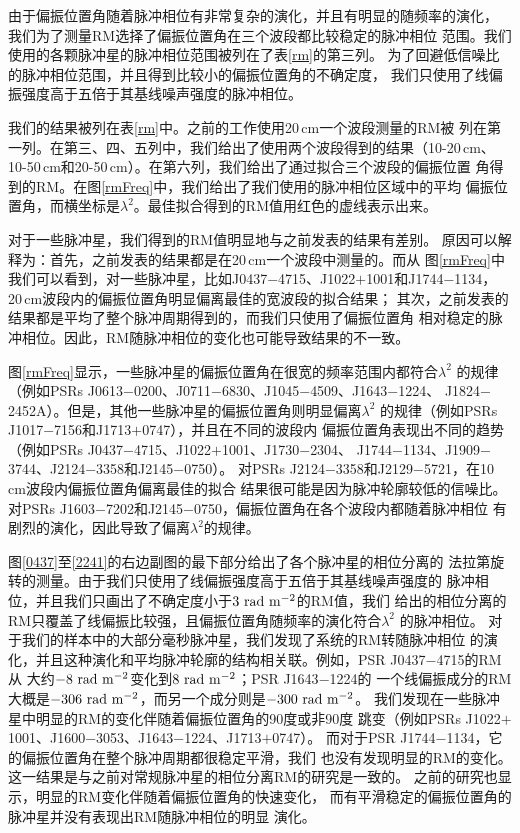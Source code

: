 由于偏振位置角随着脉冲相位有非常复杂的演化，并且有明显的随频率的演化，
我们为了测量RM选择了偏振位置角在三个波段都比较稳定的脉冲相位
范围。我们使用的各颗脉冲星的脉冲相位范围被列在了表\ref{rm}的第三列。
为了回避低信噪比的脉冲相位范围，并且得到比较小的偏振位置角的不确定度，
我们只使用了线偏振强度高于五倍于其基线噪声强度的脉冲相位。

我们的结果被列在表\ref{rm}中。之前的工作使用20\,cm一个波段测量的RM被
列在第一列。在第三、四、五列中，我们给出了使用两个波段得到的结果（10-20\,cm、
10-50\,cm和20-50\,cm）。在第六列，我们给出了通过拟合三个波段的偏振位置
角得到的RM。在图\ref{rmFreq}中，我们给出了我们使用的脉冲相位区域中的平均
偏振位置角，而横坐标是$\lambda^2$。最佳拟合得到的RM值用红色的虚线表示出来。

对于一些脉冲星，我们得到的RM值明显地与之前发表的结果有差别。
原因可以解释为：首先，之前发表的结果都是在20\,cm一个波段中测量的。而从
图\ref{rmFreq}中我们可以看到，对一些脉冲星，比如J0437$-$4715、J1022$+$1001和J1744$-$1134，
20\,cm波段内的偏振位置角明显偏离最佳的宽波段的拟合结果；
其次，之前发表的结果都是平均了整个脉冲周期得到的，而我们只使用了偏振位置角
相对稳定的脉冲相位。因此，RM随脉冲相位的变化也可能导致结果的不一致。

图\ref{rmFreq}显示，一些脉冲星的偏振位置角在很宽的频率范围内都符合$\lambda^2$
的规律（例如PSRs J0613$-$0200、J0711$-$6830、J1045$-$4509、J1643$-$1224、
J1824$-$2452A）。但是，其他一些脉冲星的偏振位置角则明显偏离$\lambda^2$
的规律（例如PSRs J1017$-$7156和J1713$+$0747），并且在不同的波段内
偏振位置角表现出不同的趋势（例如PSRs J0437$-$4715、J1022$+$1001、J1730$-$2304、
J1744$-$1134、J1909$-$3744、J2124$-$3358和J2145$-$0750）。
%
对PSRs J2124$-$3358和J2129$-$5721，在10\,cm波段内偏振位置角偏离最佳的拟合
结果很可能是因为脉冲轮廓较低的信噪比。 
%
对PSRs J1603$-$7202和J2145$-$0750，偏振位置角在各个波段内都随着脉冲相位
有剧烈的演化，因此导致了偏离$\lambda^2$的规律。

图\ref{0437}至\ref{2241}的右边副图的最下部分给出了各个脉冲星的相位分离的
法拉第旋转的测量。由于我们只使用了线偏振强度高于五倍于其基线噪声强度的
脉冲相位，并且我们只画出了不确定度小于$3\ \rm{rad\ m^{-2}}$的RM值，我们
给出的相位分离的RM只覆盖了线偏振比较强，且偏振位置角随频率的演化符合$\lambda^2$
的脉冲相位。
%
对于我们的样本中的大部分毫秒脉冲星，我们发现了系统的RM转随脉冲相位
的演化，并且这种演化和平均脉冲轮廓的结构相关联。例如，PSR J0437$-$4715的RM从
大约$-8\ \rm{rad\ m^{-2}}$变化到$8\ \rm{rad\ m^{-2}}$；PSR J1643$-$1224的
一个线偏振成分的RM大概是$-306\ \rm{rad\ m^{-2}}$，而另一个成分则是$-300\ \rm{rad\ m^{-2}}$。
%
我们发现在一些脉冲星中明显的RM的变化伴随着偏振位置角的90度或非90度
跳变（例如PSRs J1022$+$1001、J1600$-$3053、J1643$-$1224、J1713$+$0747）。
而对于PSR J1744$-$1134，它的偏振位置角在整个脉冲周期都很稳定平滑，我们
也没有发现明显的RM的变化。
%
这一结果是与之前对常规脉冲星的相位分离RM的研究是一致的。
之前的研究也显示，明显的RM变化伴随着偏振位置角的快速变化，
而有平滑稳定的偏振位置角的脉冲星并没有表现出RM随脉冲相位的明显
演化\supercite{Noutsos09}。

